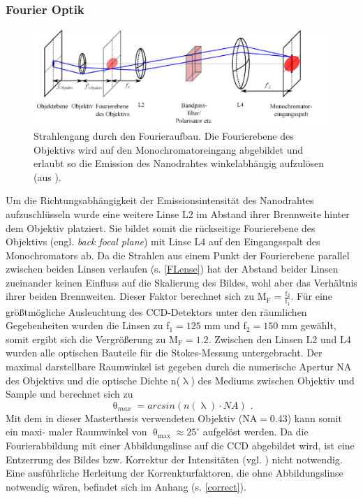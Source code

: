 \subsubsection{Fourier Optik}
\begin{figure}[h]
\centering
\includegraphics[width=1\textwidth]{Bilder/Methodik/fourier}
\caption[Impulsraumabbildung]{Strahlengang durch den Fourieraufbau. Die Fourierebene des Objektivs wird auf den Monochromatoreingang abgebildet und erlaubt so die Emission des Nanodrahtes winkelabhängig aufzulösen (aus \cite{Master.Michalsky}).}
\label{FLense}
\end{figure}
\noindent Um die Richtungsabhängigkeit der Emissionsintensität des Nanodrahtes aufzuschlüsseln wurde eine weitere Linse L2 im Abstand ihrer Brennweite hinter dem Objektiv platziert. Sie bildet somit die rückseitige Fourierebene des Objektivs (engl. \textit{back focal plane}) mit Linse L4 auf den Eingangsspalt des Monochromators ab. Da die Strahlen aus einem Punkt der Fourierebene parallel zwischen beiden Linsen verlaufen (s. \autoref{FLense}) hat der Abstand beider Linsen zueinander keinen Einfluss auf die Skalierung des Bildes, wohl aber das Verhältnis ihrer beiden Brennweiten. Dieser Faktor berechnet sich zu $\text{M}_\text{F}=\frac{\text{f}_\text{2}}{\text{f}_\text{1}}$. Für eine größtmögliche Ausleuchtung des CCD-Detektors unter den räumlichen Gegebenheiten wurden die Linsen zu f$_\text{1}=\text{125}$ mm und f$_\text{2}=\text{150}$ mm gewählt, somit ergibt sich die Vergrößerung zu $\text{M}_\text{F}=\text{1.2}$. Zwischen den Linsen L2 und L4 wurden alle optischen Bauteile für die Stokes-Messung untergebracht. Der maximal darstellbare Raumwinkel ist gegeben durch die numerische Apertur NA des Objektivs und die optische Dichte n($\uplambda$) des Mediums zwischen Objektiv und Sample und berechnet sich zu \cite{Riediger.Master}
\begin{equation}
\uptheta_{max}=arcsin\left(n(\uplambda)\cdot NA\right) \text{ .}
\end{equation}
Mit dem in dieser Masterthesis verwendeten Objektiv (NA$=$0.43) kann somit ein maxi- maler Raumwinkel von $\uptheta_\text{max} \approx \text{25}^\circ$ aufgelöst werden. Da die Fourierabbildung mit einer Abbildungslinse auf die CCD abgebildet wird, ist eine Entzerrung des Bildes bzw. Korrektur der Intensitäten (vgl. \cite{Roeder.Diss,Riediger.Master}) nicht notwendig. Eine ausführliche Herleitung der Korrenkturfaktoren, die ohne Abbildungslinse notwendig wären, befindet sich im Anhang (s. \autoref{correct}).
